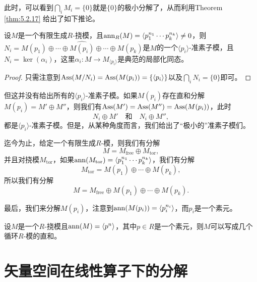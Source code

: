 此时，可以看到$\bigcap_i M_i=\{0\}$就是$\{0\}$的极小分解了，从而利用Theorem \ref{thm:5.2.17} 给出了如下推论。

\begin{coro}
设$M$是一个有限生成$R$-挠模，且$\operatorname{ann}_R(M)=\langle p_1^{n_1}\cdots p_k^{n_k}\rangle \neq 0$，则$N_i=M(p_1)\oplus \cdots \oplus \widehat{M(p_i)}\oplus \cdots  \oplus M(p_k)$是$M$的一个$\langle p_i\rangle$-准素子模，且$N_i=\ker(\alpha_i)$，这里$\alpha_i:M\to M_{\langle p_i\rangle}$是典范的局部化同态。
\end{coro}

\begin{proof}
    只需注意到$\operatorname{Ass}(M/N_i)=\operatorname{Ass}(M(p_i))=\{\langle p_i\rangle\}$以及$\bigcap_i N_i=\{0\}$即可。
\end{proof}

但这并没有给出所有的$\langle p_i\rangle$-准素子模。如果$M(p_i)$存在直和分解$M(p_i)=M'\oplus M''$，则我们有$\operatorname{Ass}(M')=\operatorname{Ass}(M'')=\operatorname{Ass}(M(p_i))$，此时
\[
    N_i\oplus M'\quad \text{和}\quad  N_i\oplus M'',
\]
都是$\langle p_i\rangle$-准素子模。但是，从某种角度而言，我们给出了“极小的”准素子模们。

\begin{para}
迄今为止，给定一个有限生成$R$-模，则我们有分解
\[
    M=M_{\mathrm{free}}\oplus M_{\mathrm{tor}},
\]
并且对挠模$M_{\mathrm{tor}}$，如果$\operatorname{ann}(M_{\mathrm{tor}})=\langle p_1^{n_1}\cdots p_k^{n_k}\rangle$，我们有分解
\[
    M_{\mathrm{tor}}=M(p_1)\oplus \cdots  \oplus M(p_k),
\]
所以我们有分解
\[
    M=M_{\mathrm{free}}\oplus M(p_1)\oplus \cdots  \oplus M(p_k).
\]
\end{para}

最后，我们来分解$M(p_i)$，注意到$\operatorname{ann}(M(p_i))=\langle p_i^{n_i}\rangle$，而$p_i$是一个素元。

\begin{pro}
设$M$是一个$R$-挠模且$\operatorname{ann}(M)=\langle p^n\rangle$，其中$p\in R$是一个素元，则$M$可以写成几个循环$R$-模的直和。
\end{pro}

\section{矢量空间在线性算子下的分解}
